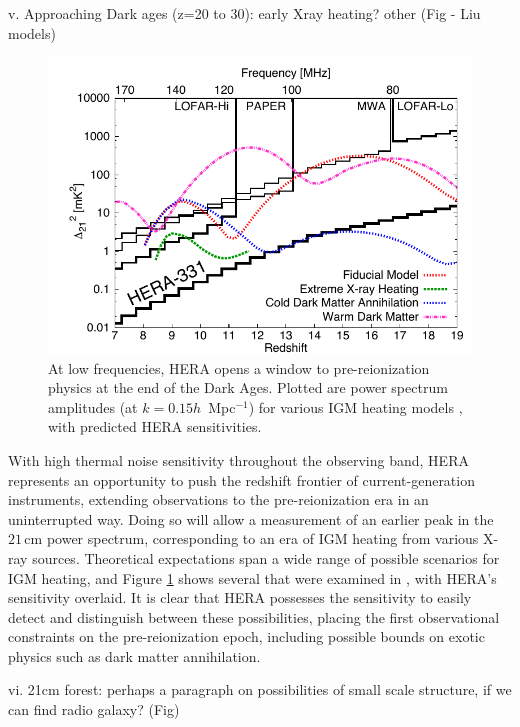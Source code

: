 \documentclass[preprint]{aastex}
\begin{document}
v. Approaching Dark ages (z=20 to 30): early Xray heating? other (Fig - Liu models)
\begin{figure}[t]\centering
\includegraphics{plots/Xray/HERA_II_compare_kp1_whoriz_20pt.pdf} 
\caption{\small 
At low frequencies, HERA opens a window to
pre-reionization physics at the end of the Dark Ages. Plotted are power spectrum amplitudes (at $k =
0.15h$~Mpc$^{-1}$) for various IGM heating models \citep{mesinger_et_al2013},
with predicted HERA sensitivities.
}\label{fig:Xray} \end{figure}

With high thermal noise sensitivity throughout the observing band, HERA represents an opportunity to push the redshift frontier of current-generation instruments, extending observations to the pre-reionization era in an uninterrupted way.  Doing so will allow a measurement of an earlier peak in the $21\,\textrm{cm}$ power spectrum, corresponding to an era of IGM heating from various X-ray sources.  Theoretical expectations span a wide range of possible scenarios for IGM heating, and Figure \ref{fig:Xray} shows several that were examined in \cite{mesinger_et_al2013}, with HERA's sensitivity overlaid.  It is clear that HERA possesses the sensitivity to easily detect and distinguish between these possibilities, placing the first observational constraints on the pre-reionization epoch, including possible bounds on exotic physics such as dark matter annihilation.


vi. 21cm forest: perhaps a paragraph on possibilities of small scale structure, if we can find radio galaxy? (Fig) 
\end{document}
